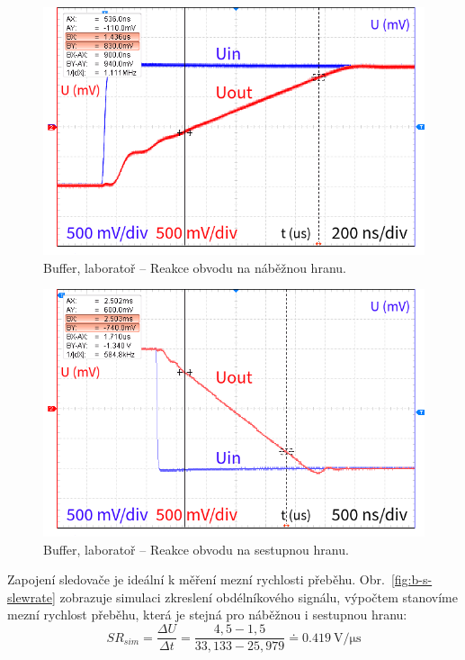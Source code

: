 \documentclass{protokol}
\begin{document}
\begin{figure}[h!]
	\centering
	\includegraphics[width=\textwidth]{oscilo/output2.png}
	\centering
	\caption{Buffer, laboratoř -- Reakce obvodu na náběžnou hranu.}
	\label{fig:b-l-slewrate-nab}
\end{figure}

	\begin{figure}[h!]
	\centering
	\includegraphics[width=\textwidth]{oscilo/output3.png}
	\centering
	\caption{Buffer, laboratoř -- Reakce obvodu na sestupnou hranu.}
	\label{fig:b-l-slewrate-ses}
\end{figure}

	Zapojení sledovače je ideální k měření mezní rychlosti přeběhu. Obr.~\ref{fig:b-s-slewrate} zobrazuje simulaci zkreslení obdélníkového signálu, výpočtem stanovíme mezní rychlost přeběhu, která je stejná pro náběžnou i sestupnou hranu:
$$ SR_{sim}=\frac{\Delta U}{\Delta t}=\frac{4,5-1,5}{33,133-25,979}\doteq \qty{0.419}{\volt\per\micro\second} $$
\end{document}
